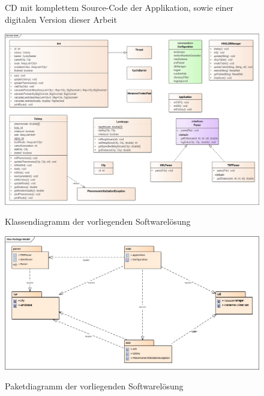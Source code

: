 \begin{appendices}
	
	\begin{figure}[h]
		\centering
		\caption{CD mit komplettem Source-Code der Applikation, sowie einer digitalen Version dieser Arbeit}
		\label{cd_freeSpace}
	\end{figure}
	\newpage
	
	\begin{figure}[h]
		\centering
		\caption{Klassendiagramm der vorliegenden Softwarelösung}
		\includegraphics[width=\linewidth]{../../../01_uml/classModel.png}
		\label{classDiagram_FullSize}
	\end{figure}
	
	\begin{figure}[h]
		\centering
		\caption{Paketdiagramm der vorliegenden Softwarelösung}
		\includegraphics[width=\linewidth]{../../../01_uml/packageModel.png}
		\label{packageDiagram}
	\end{figure}


\end{appendices}
